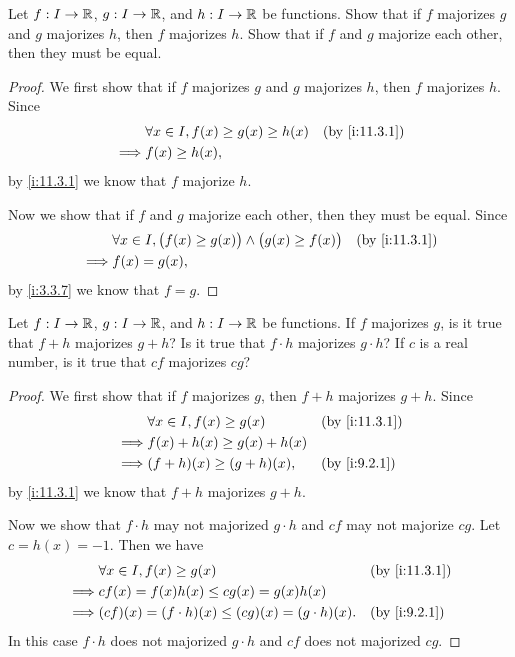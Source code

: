 \exercisesection

\begin{ex}\label{i:ex:11.3.1}
  Let \(f : I \to \mathbb{R}\), \(g : I \to \mathbb{R}\), and \(h : I \to \mathbb{R}\) be functions.
  Show that if \(f\) majorizes \(g\) and \(g\) majorizes \(h\), then \(f\) majorizes \(h\).
  Show that if \(f\) and \(g\) majorize each other, then they must be equal.
\end{ex}

\begin{proof}
  We first show that if \(f\) majorizes \(g\) and \(g\) majorizes \(h\), then \(f\) majorizes \(h\).
  Since
  \begin{align*}
             & \forall x \in I, f(x) \geq g(x) \geq h(x) &  & \by{i:11.3.1} \\
    \implies & f(x) \geq h(x),
  \end{align*}
  by \cref{i:11.3.1} we know that \(f\) majorize \(h\).

  Now we show that if \(f\) and \(g\) majorize each other, then they must be equal.
  Since
  \begin{align*}
             & \forall x \in I, \big(f(x) \geq g(x)\big) \land \big(g(x) \geq f(x)\big) &  & \by{i:11.3.1} \\
    \implies & f(x) = g(x),
  \end{align*}
  by \cref{i:3.3.7} we know that \(f = g\).
\end{proof}

\begin{ex}\label{i:ex:11.3.2}
  Let \(f : I \to \mathbb{R}\), \(g : I \to \mathbb{R}\), and \(h : I \to \mathbb{R}\) be functions.
  If \(f\) majorizes \(g\), is it true that \(f + h\) majorizes \(g + h\)?
  Is it true that \(f \cdot h\) majorizes \(g \cdot h\)?
  If \(c\) is a real number, is it true that \(cf\) majorizes \(cg\)?
\end{ex}

\begin{proof}
  We first show that if \(f\) majorizes \(g\), then \(f + h\) majorizes \(g + h\).
  Since
  \begin{align*}
             & \forall x \in I, f(x) \geq g(x) &  & \by{i:11.3.1} \\
    \implies & f(x) + h(x) \geq g(x) + h(x)                       \\
    \implies & (f + h)(x) \geq (g + h)(x),     &  & \by{i:9.2.1}
  \end{align*}
  by \cref{i:11.3.1} we know that \(f + h\) majorizes \(g + h\).

  Now we show that \(f \cdot h\) may not majorized \(g \cdot h\) and \(cf\) may not majorize \(cg\).
  Let \(c = h(x) = -1\).
  Then we have
  \begin{align*}
             & \forall x \in I, f(x) \geq g(x)                         &  & \by{i:11.3.1} \\
    \implies & cf(x) = f(x) h(x) \leq cg(x) = g(x) h(x)                                   \\
    \implies & (cf)(x) = (f \cdot h)(x) \leq (cg)(x) = (g \cdot h)(x). &  & \by{i:9.2.1}
  \end{align*}
  In this case \(f \cdot h\) does not majorized \(g \cdot h\) and \(cf\) does not majorized \(cg\).
\end{proof}

